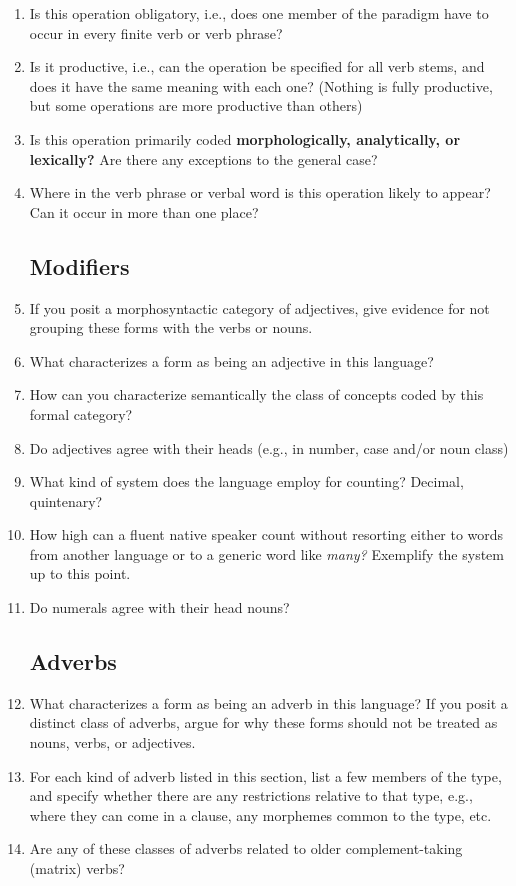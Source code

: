 \documentclass[twocolumn]{scrartcl}
\begin{document}
\begin{enumerate}[resume]
\item Is this operation obligatory, i.e., does one member of the paradigm have to occur in every finite verb or verb phrase?
\item Is it productive, i.e., can the operation be specified for all verb stems, and does it have the same meaning with each one? (Nothing is fully productive, but some operations are more productive than others)
\item Is this operation primarily coded \textbf{morphologically, analytically, or lexically?} Are there any exceptions to the general case?
\item Where in the verb phrase or verbal word is this operation likely to appear?  Can it occur in more than one place?
\subsection{Modifiers}
\item If you posit a morphosyntactic category of adjectives, give evidence for not grouping these forms with the verbs or nouns.
\item What characterizes a form as being an adjective in this language?
\item How can you characterize semantically the class of concepts coded by this formal category?
\item Do adjectives agree with their heads (e.g., in number, case and/or noun class)
\item What kind of system does the language employ for counting? Decimal, quintenary?
\item How high can a fluent native speaker count without resorting either to words from another language or to a generic word like \textit{many?} Exemplify the system up to this point.
\item Do numerals agree with their head nouns?
\subsection{Adverbs}
\item What characterizes a form as being an adverb in this language?  If you posit a distinct class of adverbs, argue for why these forms should not be treated as nouns, verbs, or adjectives.
\item For each kind of adverb listed in this section, list a few members of the type, and specify whether there are any restrictions relative to that type, e.g., where they can come in a clause, any morphemes common to the type, etc.
\item Are any of these classes of adverbs related to older complement-taking (matrix) verbs?

\end{enumerate}
\end{document}
